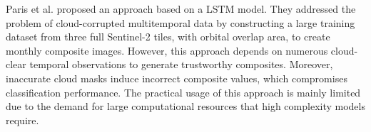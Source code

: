 \documentclass[journal,article,submit,pdftex,moreauthors]{Definitions/mdpi}
\begin{document}

Paris et al. \cite{Paris2020} 
proposed an approach based on a LSTM model.
They addressed the problem of cloud-corrupted multitemporal data by constructing a large training dataset from three full Sentinel-2 tiles, with orbital overlap area, to create monthly composite images. However, this approach depends on numerous cloud-clear temporal observations to generate trustworthy composites. Moreover, inaccurate cloud masks induce incorrect composite values, which compromises classification performance. The practical usage of this approach is mainly limited due to the demand for large computational resources that high complexity models require.

\end{document}
